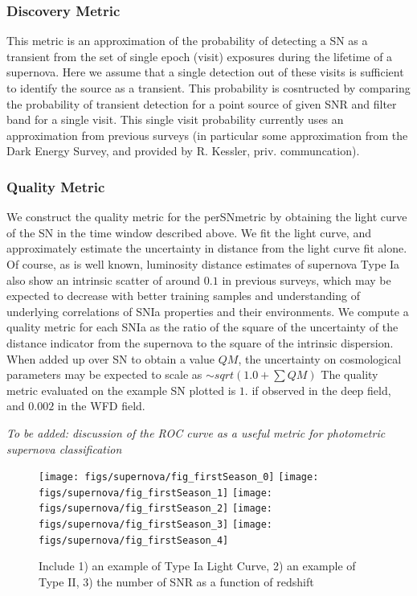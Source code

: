 \subsubsection{Discovery Metric}
This metric is an approximation of the probability of detecting a SN as a transient from the set of single epoch (visit) exposures during the lifetime of a
supernova. Here we assume that a single detection out of these visits is sufficient to identify the source as a transient. This probability is cosntructed
by comparing the probability of transient detection for a point source of
given SNR and filter band for a single visit. This single visit probability 
currently uses an approximation from previous surveys (in particular some approximation from the Dark Energy Survey, and provided by R. Kessler, priv. communcation).


\subsubsection{Quality Metric}
We construct the quality metric for the perSNmetric by obtaining the light curve of the SN in the time window described above. We fit the light curve, and 
approximately estimate the uncertainty in distance from the light curve fit alone. Of course, as is well known, luminosity distance estimates of supernova Type Ia also show an intrinsic scatter of around $0.1$ in previous surveys, which may be expected to decrease with better training samples and understanding 
of underlying correlations of SNIa properties and their environments. We compute a quality metric for each SNIa as the ratio of the square of the uncertainty of the distance indicator from the supernova to the square of the intrinsic dispersion. When added up over SN to obtain a value $QM$, the uncertainty on 
cosmological parameters may be expected to scale as $\sim sqrt(1.0 + \sum QM)$
The quality metric evaluated on the example SN plotted is $1.$ if observed in the deep field, and $0.002$ in the WFD field.

\emph{To be added: discussion of the ROC curve as a useful metric for photometric supernova 
classification}


\begin{figure}[!hb]
    \begin{minipage}[b]{\linewidth}
        \texttt{[image: figs/supernova/fig\_firstSeason\_0]}
        \texttt{[image: figs/supernova/fig\_firstSeason\_1]}
        \texttt{[image: figs/supernova/fig\_firstSeason\_2]}
        \texttt{[image: figs/supernova/fig\_firstSeason\_3]}
        \texttt{[image: figs/supernova/fig\_firstSeason\_4]}
    \end{minipage}
\label{fig:opsimSummary}
\caption{Include 1) an example of Type Ia Light Curve, 2) an example of Type II, 3) the number of SNR as a function of
redshift}
\end{figure}


